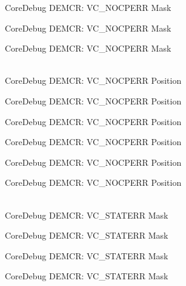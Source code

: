 \begin{DoxyRefList}
\label{deprecated__deprecated000428}%
%
Core\+Debug DEMCR:\+ VC\+\_\+\+NOCPERR Mask 

\label{deprecated__deprecated000517}%
%
Core\+Debug DEMCR:\+ VC\+\_\+\+NOCPERR Mask 

\label{deprecated__deprecated000619}%
%
Core\+Debug DEMCR:\+ VC\+\_\+\+NOCPERR Mask  
\item[{\parbox[t]{\linewidth}{Global \doxylink{group__CMSIS__CoreDebug_gac9d13eb2add61f610d5ced1f7ad2adf8}{Core\+Debug\+\_\+\+DEMCR\+\_\+\+VC\+\_\+\+NOCPERR\+\_\+\+Pos} }}]\hfill \\
\label{deprecated__deprecated000065}%
%
Core\+Debug DEMCR:\+ VC\+\_\+\+NOCPERR Position 

\label{deprecated__deprecated000209}%
%
Core\+Debug DEMCR:\+ VC\+\_\+\+NOCPERR Position 

\label{deprecated__deprecated000351}%
%
Core\+Debug DEMCR:\+ VC\+\_\+\+NOCPERR Position 

\label{deprecated__deprecated000427}%
%
Core\+Debug DEMCR:\+ VC\+\_\+\+NOCPERR Position 

\label{deprecated__deprecated000516}%
%
Core\+Debug DEMCR:\+ VC\+\_\+\+NOCPERR Position 

\label{deprecated__deprecated000618}%
%
Core\+Debug DEMCR:\+ VC\+\_\+\+NOCPERR Position  
\item[{\parbox[t]{\linewidth}{Global \doxylink{group__CMSIS__CoreDebug_gaa38b947d77672c48bba1280c0a642e19}{Core\+Debug\+\_\+\+DEMCR\+\_\+\+VC\+\_\+\+STATERR\+\_\+\+Msk} }}]\hfill \\
\label{deprecated__deprecated000062}%
%
Core\+Debug DEMCR:\+ VC\+\_\+\+STATERR Mask 

\label{deprecated__deprecated000206}%
%
Core\+Debug DEMCR:\+ VC\+\_\+\+STATERR Mask 

\label{deprecated__deprecated000348}%
%
Core\+Debug DEMCR:\+ VC\+\_\+\+STATERR Mask 

\label{deprecated__deprecated000424}%
%
Core\+Debug DEMCR:\+ VC\+\_\+\+STATERR Mask 


\end{DoxyRefList}
